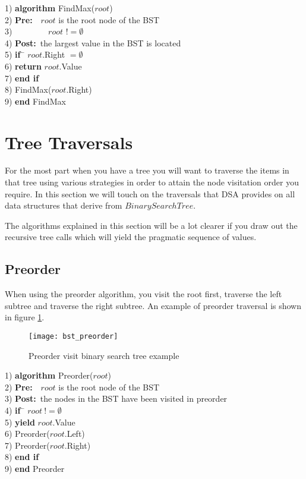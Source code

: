 \begin{tabbing}
1)  \textbf{alg}\= \textbf{orithm} FindMax($root$) \\
2)  \> \textbf{Pre:}~~$root$ is the root node of the BST \\
3)  \> ~~~~~~~~$root$ $!= \emptyset$ \\
4)  \> \textbf{Post:}~the largest value in the BST is located \\
5)  \> \textbf{if}~\= $root$.Right $= \emptyset$ \\
6)  \> \> \textbf{return} $root$.Value \\
7)  \> \textbf{end if} \\
8)  \> FindMax($root$.Right) \\
9)  \textbf{end} FindMax \\
\end{tabbing}

\section{Tree Traversals}
For the most part when you have a tree you will want to traverse the items in that tree using various strategies in order to attain the node visitation order you require. In this section we will touch on the traversals that DSA provides on all data structures that derive from $BinarySearchTree$.

The algorithms explained in this section will be a lot clearer if you draw out  the recursive tree calls which will yield the pragmatic sequence of values.

\subsection{Preorder} \label{preorder_traversal}
When using the preorder algorithm, you visit the root first, traverse the left subtree and traverse the right subtree. An example of preorder traversal is shown in figure \ref{fig:bst_preorder}.
\begin{figure}[htp]
\begin{center}
\texttt{[image: bst\_preorder]}
\end{center}
\caption{Preorder visit binary search tree example} \label{fig:bst_preorder}
\end{figure}


\begin{tabbing}
1)  \textbf{alg}\= \textbf{orithm} Preorder($root$) \\
2)  \> \textbf{Pre:}~~$root$ is the root node of the BST \\
3)  \> \textbf{Post:}~the nodes in the BST have been visited in preorder \\
4)  \> \textbf{if}~\= $root~!= \emptyset$ \\
5)  \> \> \textbf{yield} $root$.Value \\
6)  \> \> Preorder($root$.Left) \\
7)  \> \> Preorder($root$.Right) \\
8)  \> \textbf{end if} \\
9)  \textbf{end} Preorder \\
\end{tabbing}


